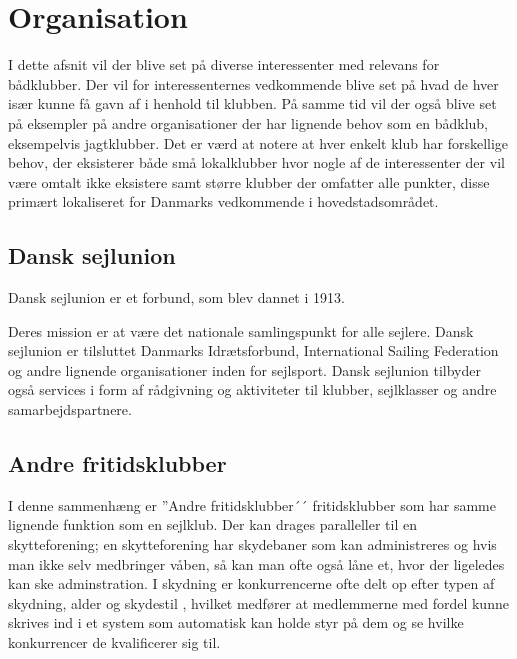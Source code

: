 \chapter{Organisation}\label{chap:organisation}

\cbstart

I dette afsnit vil der blive set på diverse interessenter med relevans for bådklubber. Der vil for
interessenternes vedkommende blive set på hvad de hver især kunne få gavn af i henhold til klubben. På
samme tid vil der også blive set på eksempler på andre organisationer der har lignende behov som en bådklub,
eksempelvis jagtklubber. Det er værd at notere at hver enkelt klub har forskellige behov, der eksisterer både
små lokalklubber hvor nogle af de interessenter der vil være omtalt ikke eksistere samt større klubber der
omfatter alle punkter, disse primært lokaliseret for Danmarks vedkommende i hovedstadsområdet.


\section{Dansk sejlunion}

Dansk sejlunion er et forbund, som blev dannet i 1913.

Deres mission er at være det nationale samlingspunkt for alle sejlere. Dansk sejlunion er tilsluttet Danmarks
Idrætsforbund, International Sailing Federation og andre lignende organisationer inden for sejlsport. Dansk
sejlunion tilbyder også services i form af rådgivning og aktiviteter til klubber, sejlklasser og andre
samarbejdspartnere.


\section{Andre fritidsklubber}

I denne sammenhæng er ''Andre fritidsklubber´´ fritidsklubber som har samme lignende funktion som en sejlklub.
Der kan drages paralleller til en skytteforening; en skytteforening har skydebaner som kan administreres og
hvis man ikke selv medbringer våben, så kan man ofte også låne et, hvor der ligeledes kan ske adminstration. I
skydning er konkurrencerne ofte delt op efter typen af skydning, alder og skydestil , hvilket
medfører at medlemmerne med fordel kunne skrives ind i et system som automatisk kan holde styr på dem og se
hvilke konkurrencer de kvalificerer sig til.


